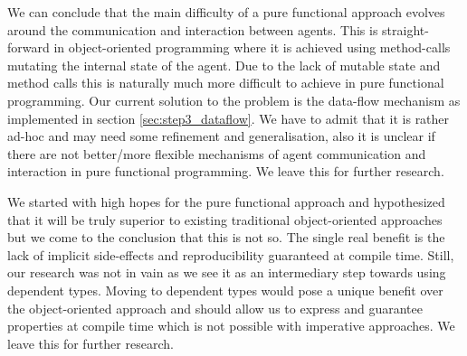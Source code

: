 We can conclude that the main difficulty of a pure functional approach evolves around the communication and interaction between agents. This is straight-forward in object-oriented programming where it is achieved using method-calls mutating the internal state of the agent. Due to the lack of mutable state and method calls this is naturally much more difficult to achieve in pure functional programming. Our current solution to the problem is the data-flow mechanism as implemented in section \ref{sec:step3_dataflow}. We have to admit that it is rather ad-hoc and may need some refinement and generalisation, also it is unclear if there are not better/more flexible mechanisms of agent communication and interaction in pure functional programming. We leave this for further research.

We started with high hopes for the pure functional approach and hypothesized that it will be truly superior to existing traditional object-oriented approaches but we come to the conclusion that this is not so. The single real benefit is the lack of implicit side-effects and reproducibility guaranteed at compile time. Still, our research was not in vain as we see it as an intermediary step towards using dependent types. Moving to dependent types would pose a unique benefit over the object-oriented approach and should allow us to express and guarantee properties at compile time which is not possible with imperative approaches. We leave this for further research.